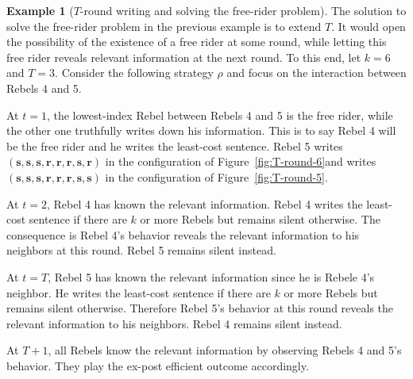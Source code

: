 \documentclass[12pt,letter]{article}
\newcommand\omicron{o}
\theoremstyle{definition}
\newtheorem{example}{Example}
\theoremstyle{remark}
\theoremstyle{claim}
\begin{document}
\begin{example}[$T$-round writing and solving the free-rider problem]
\label{ex:cost_function_talk_solve_fr}
The solution to solve the free-rider problem in the previous example is to extend $T$. It would open the possibility of the existence of a free rider at some round, while letting this free rider reveals relevant information at the next round. To this end, let $k=6$ and $T=3$. Consider the following strategy $\rho$ and focus on the interaction between Rebels 4 and 5.

At $t=1$, the lowest-index Rebel between Rebels 4 and 5 is the free rider, while the other one truthfully writes down his information. This is to say Rebel 4 will be the free rider and he writes the least-cost sentence. Rebel 5 writes $(\textbf{s},\textbf{s},\textbf{s},\textbf{r},\textbf{r},\textbf{r},\textbf{s},\textbf{r})$ in the configuration of Figure~\ref{fig:T-round-6}and writes $(\textbf{s},\textbf{s},\textbf{s},\textbf{r},\textbf{r},\textbf{r},\textbf{s},\textbf{s})$ in the configuration of Figure~\ref{fig:T-round-5}. 

At $t=2$, Rebel 4 has known the relevant information. Rebel 4 writes the least-cost sentence if there are $k$ or more Rebels but remains silent otherwise. The consequence is Rebel 4's behavior reveals the relevant information to his neighbors at this round. Rebel 5 remains silent instead. 

At $t=T$, Rebel 5 has known the relevant information since he is Rebele 4's neighbor. He writes the least-cost sentence if there are $k$ or more Rebels but remains silent otherwise. Therefore Rebel 5's behavior at this round reveals the relevant information to his neighbors. Rebel 4 remains silent instead.

At $T+1$, all Rebels know the relevant information by observing Rebels 4 and 5's behavior. They play the ex-post efficient outcome accordingly. 



\end{example}
\end{document}
